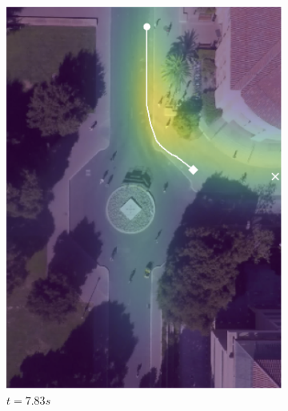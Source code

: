 \documentclass[letterpaper,10pt,conference]{ieeeconf}
\begin{document}
\begin{figure}
	\begin{subfigure}[b]{.45\linewidth}
		\includegraphics[width=\linewidth]{./figures/FirstPage/gates_1_2_t=235.png}
		\caption{$t=7.83s$}
	\end{subfigure}
	\begin{subfigure}[b]{.45\linewidth}

\end{subfigure}
\end{figure}
\end{document}
